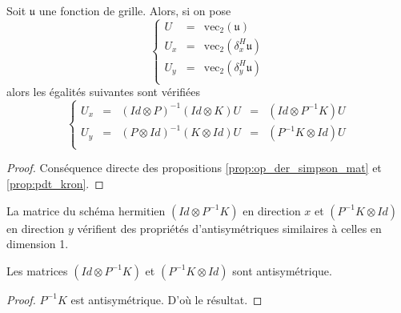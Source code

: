 \begin{theoreme}
Soit $\mathfrak{u}$ une fonction de grille. Alors, si on pose 
\begin{equation}
\left\lbrace
\begin{array}{rcl}
U & = & \text{vec}_2 (\mathfrak{u}) \\
U_x & = & \text{vec}_2 (\delta_x^H \mathfrak{u}) \\
U_y & = & \text{vec}_2 (\delta_y^H \mathfrak{u}) \\
\end{array}
\right.
\end{equation}
alors les égalités suivantes sont vérifiées
\begin{equation}
\left\lbrace
\begin{array}{rcccl}
U_x &=& (Id \otimes P)^{-1}(Id \otimes K) U &=& (Id \otimes P^{-1}K)U \\
U_y &=& (P \otimes Id)^{-1}(K \otimes Id) U &=& (P^{-1}K \otimes Id)U\\
\end{array}
\right.
\end{equation}
\end{theoreme}

\begin{proof}
Conséquence directe des propositions \ref{prop:op_der_simpson_mat} et \ref{prop:pdt_kron}.
\end{proof}

La matrice du schéma hermitien $(Id \otimes P^{-1}K)$ en direction $x$ et $(P^{-1}K \otimes Id)$ en direction $y$ vérifient des propriétés d'antisymétriques similaires à celles en dimension 1.
\begin{proposition}
Les matrices $(Id \otimes P^{-1}K)$ et $(P^{-1}K \otimes Id)$ sont antisymétrique.
\end{proposition}

\begin{proof}
$P^{-1}K$ est antisymétrique. D'où le résultat.
\end{proof}















